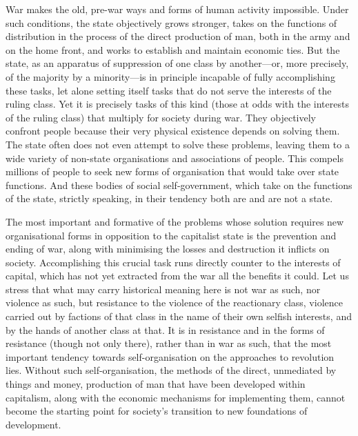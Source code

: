 \documentclass[12pt,a4paper,openany]{book}
\begin{document}
War makes the old, pre-war ways and forms of human activity impossible. Under such conditions, the state objectively grows stronger, takes on the functions of distribution in the process of the direct production of man, both in the army and on the home front, and works to establish and maintain economic ties. But the state, as an apparatus of suppression of one class by another—or, more precisely, of the majority by a minority—is in principle incapable of fully accomplishing these tasks, let alone setting itself tasks that do not serve the interests of the ruling class. Yet it is precisely tasks of this kind (those at odds with the interests of the ruling class) that multiply for society during war. They objectively confront people because their very physical existence depends on solving them. The state often does not even attempt to solve these problems, leaving them to a wide variety of non-state organisations and associations of people. This compels millions of people to seek new forms of organisation that would take over state functions. And these bodies of social self-government, which take on the functions of the state, strictly speaking, in their tendency both are and are not a state.

The most important and formative of the problems whose solution requires new organisational forms in opposition to the capitalist state is the prevention and ending of war, along with minimising the losses and destruction it inflicts on society. Accomplishing this crucial task runs directly counter to the interests of capital, which has not yet extracted from the war all the benefits it could. Let us stress that what may carry historical meaning here is not war as such, nor violence as such, but resistance to the violence of the reactionary class, violence carried out by factions of that class in the name of their own selfish interests, and by the hands of another class at that. It is in resistance and in the forms of resistance (though not only there), rather than in war as such, that the most important tendency towards self-organisation on the approaches to revolution lies. Without such self-organisation, the methods of the direct, unmediated by things and money, production of man that have been developed within capitalism, along with the economic mechanisms for implementing them, cannot become the starting point for society’s transition to new foundations of development.
\end{document}
